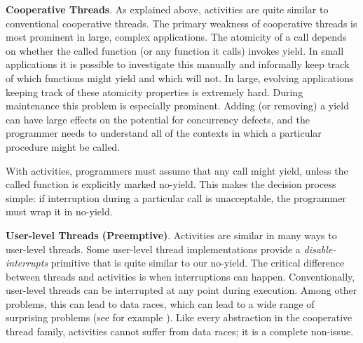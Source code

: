 \documentclass[9pt,preprint]{sigplanconf}
\begin{document}
\textbf{Cooperative Threads}.
As explained above, activities are quite similar to conventional cooperative threads.
The primary weakness of cooperative threads is most prominent in large, complex applications.
The atomicity of a call depends on whether the called function (or any function it calls) invokes yield.
In small applications it is possible to investigate this manually and informally keep track of which functions might yield and which will not.
In large, evolving applications keeping track of these atomicity properties is extremely hard.
During maintenance this problem is especially prominent.
Adding (or removing) a yield can have large effects on the potential for concurrency defects, and the programmer needs to understand all of the contexts in which a particular procedure might be called.

With activities, programmers must assume that any call might yield, unless the called function is explicitly marked no-yield.
This makes the decision process simple: if interruption during a particular call is unacceptable, the programmer must wrap it in no-yield.



\textbf{User-level Threads (Preemptive)}.
Activities are similar in many ways to user-level threads.
Some user-level thread implementations provide a \emph{disable-interrupts} primitive that is quite similar to our no-yield.
The critical difference between threads and activities is when interruptions can happen.
Conventionally, user-level threads can be interrupted at any point during execution.
Among other problems, this can lead to data races, which can lead to a wide range of surprising problems (see for example \cite{Boehm2011}).
Like every abstraction in the cooperative thread family, activities cannot suffer from data races; it is a complete non-issue.
\end{document}
